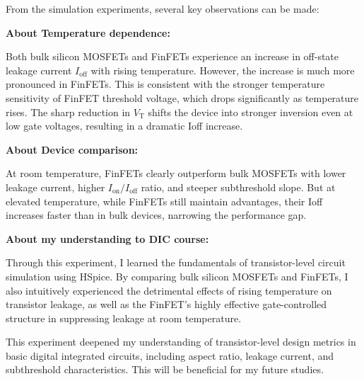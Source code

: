 \documentclass[UTF8,12pt,a4paper]{article}
\begin{document}
From the simulation experiments, several key observations can be made:

\textbf{About Temperature dependence:}

Both bulk silicon MOSFETs and FinFETs experience an increase in off-state leakage current $I_{\text{off}}$ with rising temperature. However, the increase is much more pronounced in FinFETs. This is consistent with the stronger temperature sensitivity of FinFET threshold voltage, which drops significantly as temperature rises. The sharp reduction in $V_{\text{T}}$ shifts the device into stronger inversion even at low gate voltages, resulting in a dramatic Ioff increase.

\textbf{About Device comparison:}

At room temperature, FinFETs clearly outperform bulk MOSFETs with lower leakage current, higher $I_{\text{on}}/I_{\text{off}}$ ratio, and steeper subthreshold slope. But at elevated temperature, while FinFETs still maintain advantages, their Ioff increases faster than in bulk devices, narrowing the performance gap.

\textbf{About my understanding to DIC course:}

Through this experiment, I learned the fundamentals of transistor-level circuit simulation using HSpice. By comparing bulk silicon MOSFETs and FinFETs, I also intuitively experienced the detrimental effects of rising temperature on transistor leakage, as well as the FinFET's highly effective gate-controlled structure in suppressing leakage at room temperature.

This experiment deepened my understanding of transistor-level design metrics in basic digital integrated circuits, including aspect ratio, leakage current, and subthreshold characteristics. This will be beneficial for my future studies.
% 
\end{document}
